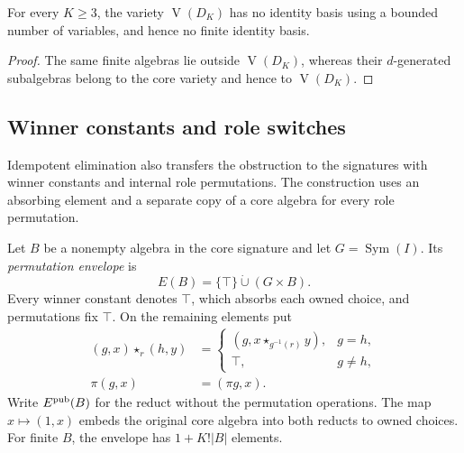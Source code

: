 \begin{corollary}
\label{core:cor:ambient-nfb}
For every $K\geq3$, the variety $\operatorname V(D_K)$ has no identity
basis using a bounded number of variables, and hence no finite identity
basis.
\end{corollary}
\begin{proof}
The same finite algebras lie outside $\operatorname V(D_K)$, whereas their
$d$-generated subalgebras belong to the core variety and hence to
$\operatorname V(D_K)$.
\end{proof}

\subsection{Winner constants and role switches}\label{app:full-signature}

Idempotent elimination also transfers the obstruction to the signatures
with winner constants and internal role permutations. The construction
uses an absorbing element and a separate copy of a core algebra for
every role permutation.

Let $B$ be a nonempty algebra in the core signature and let
$G=\operatorname{Sym}(I)$. Its \emph{permutation envelope} is
\[
 E(B)=\{\top\}\mathbin{\dot\cup}(G\times B).
\]
Every winner constant denotes $\top$, which absorbs each owned choice,
and permutations fix $\top$. On the remaining elements put
\begin{align*}
 (g,x)\star_r(h,y)
   &=\begin{cases}
       (g,x\star_{g^{-1}(r)}y),&g=h,\\
       \top,&g\ne h,
     \end{cases}\\
 \pi(g,x)&=(\pi g,x).
\end{align*}
Write $E^{\rm pub}(B)$ for the reduct without the permutation operations.
The map $x\mapsto(1,x)$ embeds the original core algebra into both
reducts to owned choices. For finite $B$, the envelope has
$1+K!|B|$ elements.

